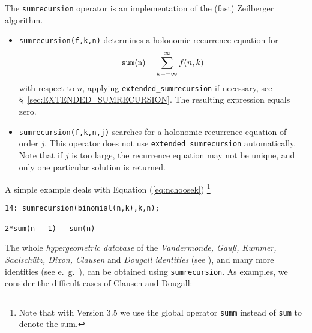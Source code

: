 The {\tt sumrecursion} operator is an implementation of the (fast)
Zeilberger algorithm.
\begin{itemize}
\item
{\tt sumrecursion(f,k,n)} determines a holonomic recurrence equation
for
\[
{\tt sum(n)} =\sum\limits_{k=-\infty}^\infty f(n,k)
\]
with respect to $n$, applying
{\tt extended\verb+_+sumrecursion} if necessary,
see \S~\ref{sec:EXTENDED_SUMRECURSION}.
The resulting expression equals zero.
\item
{\tt sumrecursion(f,k,n,j)} %
searches for a holonomic recurrence equation of order $j$. This
operator does not use {\tt extended\verb+_+sumrecursion} automatically.
Note that if $j$ is too large, the recurrence equation
may not be unique, and only one particular solution is returned.
\end{itemize}
A simple example deals with Equation (\ref{eq:nchoosek})%
\footnote{Note that with \REDUCE{} Version 3.5 we use the global operator
{\tt summ} instead of {\tt sum} to denote the sum.}

{\small
\begin{verbatim}
14: sumrecursion(binomial(n,k),k,n);

2*sum(n - 1) - sum(n)
\end{verbatim}
}\noindent
The whole {\sl hypergeometric database} of the {\sl
Vandermonde, Gau{\ss}, Kummer, Saalsch\"utz, Dixon, Clausen} and {\sl Dougall
identities} (see \cite{Wilf}), and many more identities (see e.\ g.\
\cite{Koepf}), can be obtained using {\tt sumrecursion}.
As examples, we consider the difficult cases of Clausen and Dougall:%

